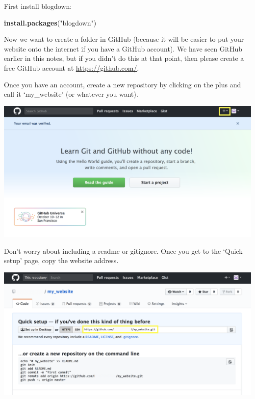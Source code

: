 \documentclass[
]{book}
\newenvironment{Shaded}{\begin{snugshade}}{\end{snugshade}}
\newcommand{\KeywordTok}[1]{\textcolor[rgb]{0.13,0.29,0.53}{\textbf{#1}}}
\newcommand{\NormalTok}[1]{#1}
\newcommand{\StringTok}[1]{\textcolor[rgb]{0.31,0.60,0.02}{#1}}
\begin{document}
First install blogdown:

\begin{Shaded}
\begin{Highlighting}[]
\KeywordTok{install.packages}\NormalTok{(}\StringTok{"blogdown"}\NormalTok{)}
\end{Highlighting}
\end{Shaded}

Now we want to create a folder in GitHub (because it will be easier to put your website onto the internet if you have a GitHub account). We have seen GitHub earlier in this notes, but if you didn't do this at that point, then please create a free GitHub account at \url{https://github.com/}.

Once you have an account, create a new repository by clicking on the plus and call it `my\_website' (or whatever you want).

\includegraphics[width=29.89in]{figures/images/blogdown_github_1}

Don't worry about including a readme or gitignore. Once you get to the `Quick setup' page, copy the website address.

\includegraphics[width=29.36in]{figures/images/blogdown_github_2}
\end{document}
